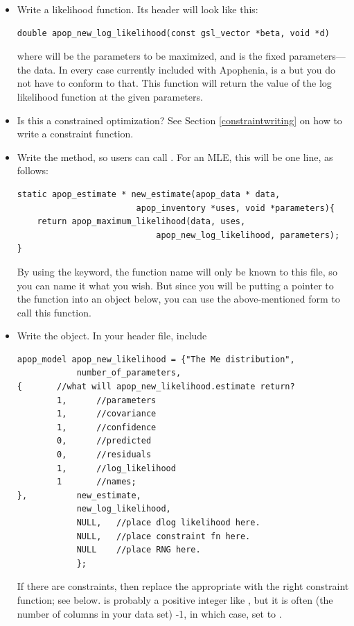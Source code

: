 \begin{itemize}
\item Write a likelihood function. Its header will look like this:
\begin{lstlisting}
double apop_new_log_likelihood(const gsl_vector *beta, void *d)
\end{lstlisting}
where  will be the parameters to be maximized, and  is the fixed parameters---the data. In every case currently included
with Apophenia,  is a  but you do not have to conform
to that. This function will return the value of the log likelihood function at the given parameters.

\item Is this a constrained optimization? See Section
\ref{constraintwriting} on how to write a constraint function.

\item Write the  method, so users can call 
. For an MLE, this will be one line,
as follows:
\begin{lstlisting}
static apop_estimate * new_estimate(apop_data * data, 
                        apop_inventory *uses, void *parameters){
    return apop_maximum_likelihood(data, uses, 
                            apop_new_log_likelihood, parameters);
}
\end{lstlisting}
By using the  keyword, the function name will only be
known to this file, so you can name it what you wish.  But since you
will be putting a pointer to the function into an object below, you
can use the above-mentioned 
form to call this function. 


\item Write the object. In your header file, include 
\begin{lstlisting}
apop_model apop_new_likelihood = {"The Me distribution", 
            number_of_parameters, 
{       //what will apop_new_likelihood.estimate return?
        1,      //parameters 
        1,      //covariance
        1,      //confidence
        0,      //predicted
        0,      //residuals
        1,      //log_likelihood
        1       //names;
},          new_estimate,
            new_log_likelihood, 
            NULL,   //place dlog likelihood here.
            NULL,   //place constraint fn here.
            NULL    //place RNG here.
            };
\end{lstlisting}
If there are constraints, then replace the appropriate  with the right constraint function; see below.
 is probably a positive integer like , but
it is often (the number of columns in your data set) -1, in which case,
set  to .


\end{itemize}
